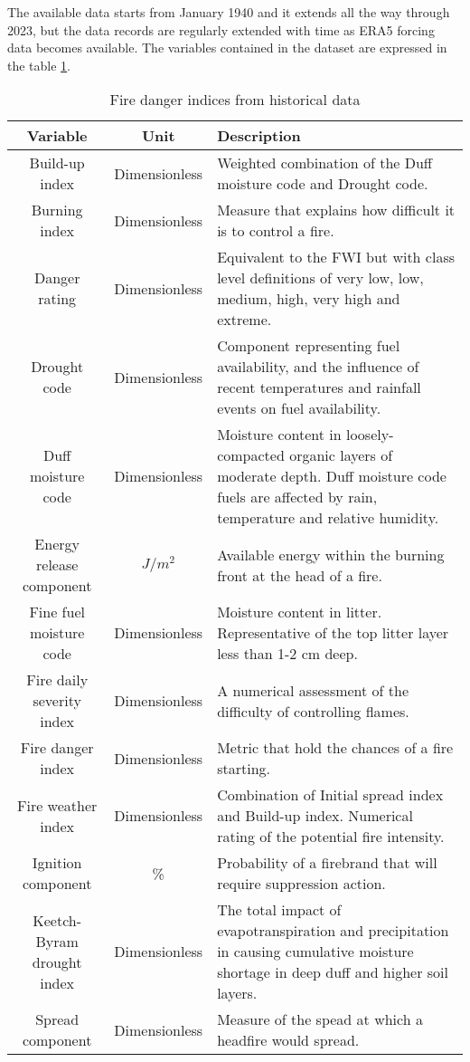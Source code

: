 The available data starts from January 1940 and it extends all the way through 2023, but the data records are regularly extended with time as ERA5 forcing data becomes available. The variables contained in the dataset are expressed in the table \ref{copernicus_danger_indices}.
\begin{table}[h!]

\caption{Fire danger indices from historical data}
\label{copernicus_danger_indices}
\centering
\small
\begin{tabular}{|c|c|p{7.5cm}|} %
\hline
\textbf{Variable} & \textbf{Unit} & \textbf{Description}\\
\hline
Build-up index & Dimensionless & Weighted combination of the Duff moisture code and Drought code. \\
\hline
Burning index & Dimensionless & Measure that explains how difficult it is to control a fire. \\
\hline
Danger rating & Dimensionless & Equivalent to the FWI but with class level definitions of very low, low, medium, high, very high and extreme. \\
\hline
Drought code & Dimensionless & Component representing fuel availability, and the influence of recent temperatures and rainfall events on fuel availability. \\
\hline
Duff moisture code & Dimensionless & Moisture content in loosely-compacted organic layers of moderate depth. Duff moisture code fuels are affected by rain, temperature and relative humidity. \\
\hline
Energy release component & $J/m^2$ & Available energy within the burning front at the head of a fire. \\
\hline
Fine fuel moisture code & Dimensionless &  Moisture content in litter. Representative of the top litter layer less than 1-2 cm deep. \\
\hline
Fire daily severity index & Dimensionless &  A numerical assessment of the difficulty of controlling flames. \\
\hline
Fire danger index & Dimensionless &  Metric that hold the chances of a fire starting. \\
\hline
Fire weather index & Dimensionless &  Combination of Initial spread index and Build-up index. Numerical rating of the potential fire intensity. \\
\hline
Ignition component & \% &  Probability of a firebrand that will require suppression action. \\
\hline
Keetch-Byram drought index & Dimensionless &  The total impact of evapotranspiration and precipitation in causing cumulative moisture shortage in deep duff and higher soil layers. \\
\hline
Spread component & Dimensionless &  Measure of the spead at which a headfire would spread. \\
\hline
\end{tabular}
\end{table}



